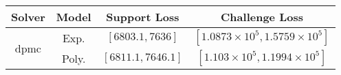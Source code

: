 \begin{tabular}{cc|c|c} 
\hline 
 Solver & Model & Support Loss  & Challenge Loss \tabularnewline\hline 
\hline 
\multirow{2}{*}{dpmc} & Exp. & $\left[6803.1,7636\right]$ & $\left[1.0873\times10^{5},1.5759\times10^{5}\right]$ \tabularnewline 
 & Poly. & $\left[6811.1,7646.1\right]$ & $\left[1.103\times10^{5},1.1994\times10^{5}\right]$ \tabularnewline 
\hline 
\end{tabular} 

